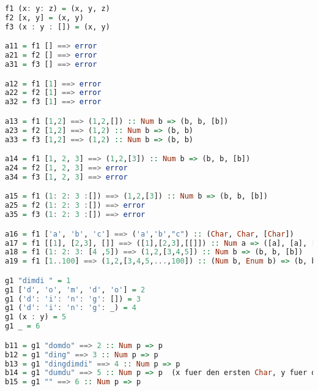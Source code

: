 \begin{lstlisting}[language=Haskell]
f1 (x: y: z) = (x, y, z)
f2 [x, y] = (x, y)
f3 (x : y : []) = (x, y)

a11 = f1 [] ==> error
a21 = f2 [] ==> error
a31 = f3 [] ==> error

a12 = f1 [1] ==> error
a22 = f2 [1] ==> error
a32 = f3 [1] ==> error

a13 = f1 [1,2] ==> (1,2,[]) :: Num b => (b, b, [b])
a23 = f2 [1,2] ==> (1,2) :: Num b => (b, b)
a33 = f3 [1,2] ==> (1,2) :: Num b => (b, b)

a14 = f1 [1, 2, 3] ==> (1,2,[3]) :: Num b => (b, b, [b])
a24 = f2 [1, 2, 3] ==> error
a34 = f3 [1, 2, 3] ==> error

a15 = f1 (1: 2: 3 :[]) ==> (1,2,[3]) :: Num b => (b, b, [b])
a25 = f2 (1: 2: 3 :[]) ==> error
a35 = f3 (1: 2: 3 :[]) ==> error

a16 = f1 ['a', 'b', 'c'] ==> ('a','b',"c") :: (Char, Char, [Char])
a17 = f1 [[1], [2,3], []] ==> ([1],[2,3],[[]]) :: Num a => ([a], [a], [[a]])
a18 = f1 (1: 2: 3: [4 ,5]) ==> (1,2,[3,4,5]) :: Num b => (b, b, [b])
a19 = f1 [1..100] ==> (1,2,[3,4,5,...,100]) :: (Num b, Enum b) => (b, b, [b])

g1 "dimdi " = 1
g1 ['d', 'o', 'm', 'd', 'o'] = 2
g1 ('d': 'i': 'n': 'g': []) = 3
g1 ('d': 'i': 'n': 'g': _) = 4
g1 (x : y) = 5
g1 _ = 6

b11 = g1 "domdo" ==> 2 :: Num p => p
b12 = g1 "ding" ==> 3 :: Num p => p
b13 = g1 "dingdimdi" ==> 4 :: Num p => p
b14 = g1 "dumdu" ==> 5 :: Num p => p  (x fuer den ersten Char, y fuer den Rest)
b15 = g1 "" ==> 6 :: Num p => p
\end{lstlisting}

\clearpage